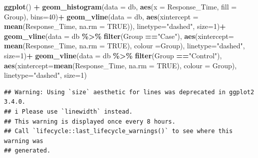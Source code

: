 \documentclass[
]{article}
\newenvironment{Shaded}{\begin{snugshade}}{\end{snugshade}}
\newcommand{\AttributeTok}[1]{\textcolor[rgb]{0.13,0.29,0.53}{#1}}
\newcommand{\ConstantTok}[1]{\textcolor[rgb]{0.56,0.35,0.01}{#1}}
\newcommand{\DecValTok}[1]{\textcolor[rgb]{0.00,0.00,0.81}{#1}}
\newcommand{\FunctionTok}[1]{\textcolor[rgb]{0.13,0.29,0.53}{\textbf{#1}}}
\newcommand{\NormalTok}[1]{#1}
\newcommand{\SpecialCharTok}[1]{\textcolor[rgb]{0.81,0.36,0.00}{\textbf{#1}}}
\newcommand{\StringTok}[1]{\textcolor[rgb]{0.31,0.60,0.02}{#1}}
\begin{document}
\begin{Shaded}
\begin{Highlighting}[]
\FunctionTok{ggplot}\NormalTok{() }\SpecialCharTok{+} 
  \FunctionTok{geom\_histogram}\NormalTok{(}\AttributeTok{data =}\NormalTok{ db, }\FunctionTok{aes}\NormalTok{(}\AttributeTok{x =}\NormalTok{ Response\_Time,  }
                     \AttributeTok{fill =}\NormalTok{ Group), }\AttributeTok{bins=}\DecValTok{40}\NormalTok{)}\SpecialCharTok{+}
  \FunctionTok{geom\_vline}\NormalTok{(}\AttributeTok{data =}\NormalTok{ db, }\FunctionTok{aes}\NormalTok{(}\AttributeTok{xintercept =} \FunctionTok{mean}\NormalTok{(Response\_Time, }\AttributeTok{na.rm =} \ConstantTok{TRUE}\NormalTok{)),}
              \AttributeTok{linetype=}\StringTok{"dashed"}\NormalTok{, }\AttributeTok{size=}\DecValTok{1}\NormalTok{)}\SpecialCharTok{+}
  \FunctionTok{geom\_vline}\NormalTok{(}\AttributeTok{data =}\NormalTok{ db }\SpecialCharTok{\%\textgreater{}\%} \FunctionTok{filter}\NormalTok{(Group }\SpecialCharTok{==}\StringTok{"Case"}\NormalTok{), }
             \FunctionTok{aes}\NormalTok{(}\AttributeTok{xintercept=} \FunctionTok{mean}\NormalTok{(Response\_Time, }\AttributeTok{na.rm =} \ConstantTok{TRUE}\NormalTok{), }
                 \AttributeTok{colour =}\NormalTok{Group),}
             \AttributeTok{linetype=}\StringTok{"dashed"}\NormalTok{, }
             \AttributeTok{size=}\DecValTok{1}\NormalTok{)}\SpecialCharTok{+}
  \FunctionTok{geom\_vline}\NormalTok{(}\AttributeTok{data =}\NormalTok{ db }\SpecialCharTok{\%\textgreater{}\%} \FunctionTok{filter}\NormalTok{(Group }\SpecialCharTok{==}\StringTok{"Control"}\NormalTok{),}
             \FunctionTok{aes}\NormalTok{(}\AttributeTok{xintercept=}\FunctionTok{mean}\NormalTok{(Response\_Time, }\AttributeTok{na.rm =} \ConstantTok{TRUE}\NormalTok{), }
                 \AttributeTok{colour =}\NormalTok{ Group),}
             \AttributeTok{linetype=}\StringTok{"dashed"}\NormalTok{, }
             \AttributeTok{size=}\DecValTok{1}\NormalTok{)}
\end{Highlighting}
\end{Shaded}

\begin{verbatim}
## Warning: Using `size` aesthetic for lines was deprecated in ggplot2 3.4.0.
## i Please use `linewidth` instead.
## This warning is displayed once every 8 hours.
## Call `lifecycle::last_lifecycle_warnings()` to see where this warning was
## generated.
\end{verbatim}
\end{document}

